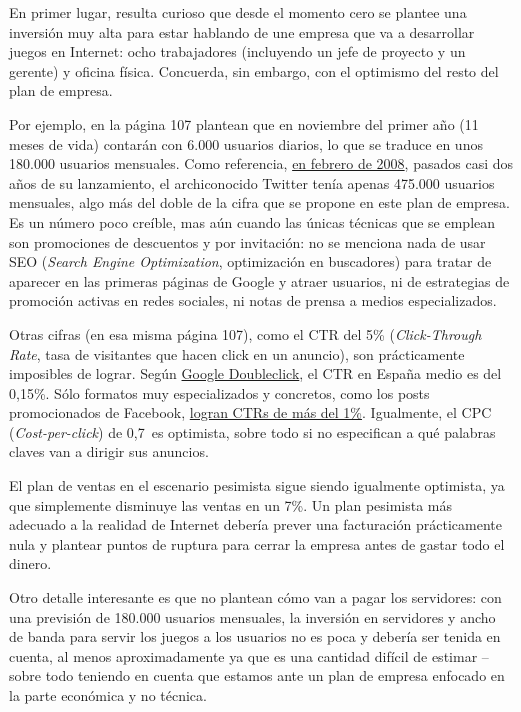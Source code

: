 \documentclass[nochap,palatino,shortheader]{apuntes}
\begin{document}
En primer lugar, resulta curioso que desde el momento cero se plantee una inversión muy alta para estar hablando de une empresa que va a desarrollar juegos en Internet: ocho trabajadores (incluyendo un jefe de proyecto y un gerente) y oficina física. Concuerda, sin embargo, con el optimismo del resto del plan de empresa.

Por ejemplo, en la página 107 plantean que en noviembre del primer año (11 meses de vida) contarán con 6.000 usuarios diarios, lo que se traduce en unos 180.000 usuarios mensuales.
Como referencia, \href{http://www.nielsen.com/us/en/insights/news/2009/twitters-tweet-smell-of-success.html}{en febrero de 2008}, pasados casi dos años de su lanzamiento, el archiconocido Twitter tenía apenas 475.000 usuarios mensuales, algo más del doble de la cifra que se propone en este plan de empresa.
Es un número poco creíble, mas aún cuando las únicas técnicas que se emplean son promociones de descuentos y por invitación: no se menciona nada de usar SEO (\textit{Search Engine Optimization}, optimización en buscadores) para tratar de aparecer en las primeras páginas de Google y atraer usuarios, ni de estrategias de promoción activas en redes sociales, ni notas de prensa a medios especializados.

Otras cifras (en esa misma página 107), como el CTR del 5\% (\textit{Click-Through Rate}, tasa de visitantes que hacen click en un anuncio), son prácticamente imposibles de lograr. Según \href{http://www.richmediagallery.com/tools/benchmarks}{Google Doubleclick}, el CTR en España medio es del 0,15\%. Sólo formatos muy especializados y concretos, como los posts promocionados de Facebook, \href{http://www.smartinsights.com/social-media-marketing/facebook-marketing/facebook-ad-formats-work-best-boosted-posts-vs-promoted-posts-vs-separate-ads-test/}{logran CTRs de más del 1\%}. Igualmente, el CPC (\textit{Cost-per-click}) de 0,7\texteuro\ es optimista, sobre todo si no especifican a qué palabras claves van a dirigir sus anuncios.

El plan de ventas en el escenario pesimista sigue siendo igualmente optimista, ya que simplemente disminuye las ventas en un 7\%. Un plan pesimista más adecuado a la realidad de Internet debería prever una facturación prácticamente nula y plantear puntos de ruptura para cerrar la empresa antes de gastar todo el dinero.

Otro detalle interesante es que no plantean cómo van a pagar los servidores: con una previsión de 180.000 usuarios mensuales, la inversión en servidores y ancho de banda para servir los juegos a los usuarios no es poca y debería ser tenida en cuenta, al menos aproximadamente ya que es una cantidad difícil de estimar -- sobre todo teniendo en cuenta que estamos ante un plan de empresa enfocado en la parte económica y no técnica.
\end{document}
